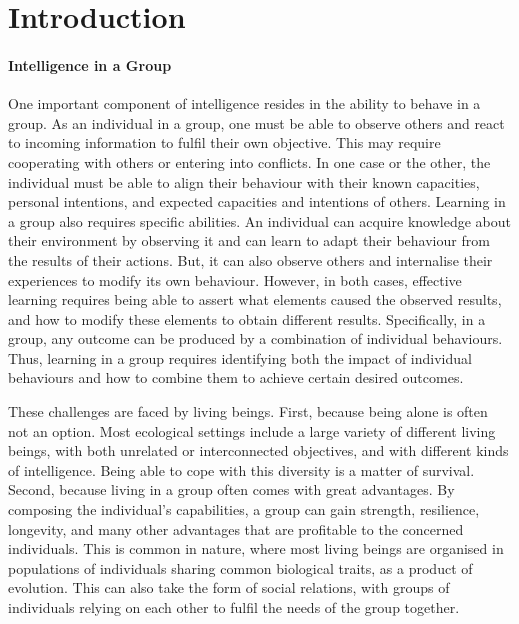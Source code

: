 

\chapter{Introduction}

\label{ChapterIntro} 

\subsubsection{Intelligence in a Group}

One important component of intelligence resides in the ability to behave in a group. As an individual in a group, one must be able to observe others and react to incoming information to fulfil their own objective. This may require cooperating with others or entering into conflicts. In one case or the other, the individual must be able to align their behaviour with their known capacities, personal intentions, and expected capacities and intentions of others. Learning in a group also requires specific abilities. An individual can acquire knowledge about their environment by observing it and can learn to adapt their behaviour from the results of their actions. But, it can also observe others and internalise their experiences to modify its own behaviour. However, in both cases, effective learning requires being able to assert what elements caused the observed results, and how to modify these elements to obtain different results. Specifically, in a group, any outcome can be produced by a combination of individual behaviours. Thus, learning in a group requires identifying both the impact of individual behaviours and how to combine them to achieve certain desired outcomes. 

These challenges are faced by living beings. First, because being alone is often not an option. Most ecological settings include a large variety of different living beings, with both unrelated or interconnected objectives, and with different kinds of intelligence. Being able to cope with this diversity is a matter of survival. Second, because living in a group often comes with great advantages. By composing the individual's capabilities, a group can gain strength, resilience, longevity, and many other advantages that are profitable to the concerned individuals. This is common in nature, where most living beings are organised in populations of individuals sharing common biological traits, as a product of evolution. This can also take the form of social relations, with groups of individuals relying on each other to fulfil the needs of the group together. 

